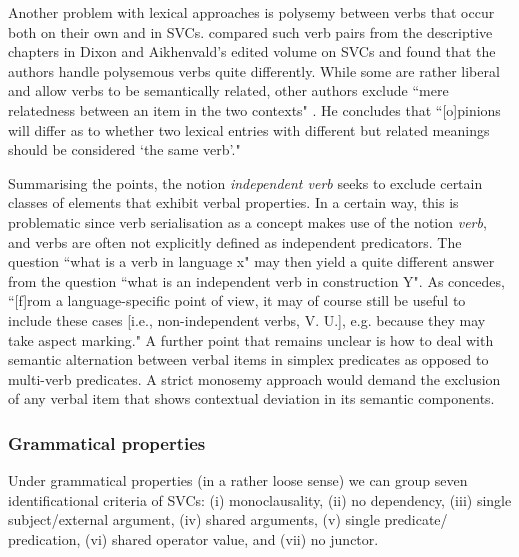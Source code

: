 Another problem with lexical approaches is polysemy between verbs that occur both on their own and in SVCs. \citet{enfield2009review} compared such verb pairs from the descriptive chapters in Dixon and Aikhenvald's edited volume on SVCs and found that the authors handle polysemous verbs quite differently. While some are rather liberal and allow verbs to be semantically related, other authors exclude ``mere relatedness between an item in the two contexts" \citep[448]{enfield2009review}. He concludes that ``[o]pinions will differ as to whether two lexical entries with different but related meanings should be considered `the same verb’."

Summarising the points, the notion \textit{independent verb} seeks to exclude certain classes of elements that exhibit verbal properties. In a certain way, this is problematic since verb serialisation as a concept makes use of the notion \textit{verb}, and verbs are often not explicitly defined as independent predicators. The question ``what is a verb in language x" may then yield a quite different answer from the question ``what is an independent verb in construction Y". As \citet[304]{haspelmath2016serial} concedes, ``[f]rom a language-specific point of view, it may of course still be useful to include these cases [i.e., non-independent verbs, V. U.], e.g. because they may take aspect marking." A further point that remains unclear is how to deal with semantic alternation between verbal items in simplex predicates as opposed to multi-verb predicates. A strict monosemy approach would demand the exclusion of any verbal item that shows contextual deviation in its semantic components.

\subsubsection{Grammatical properties}\label{sec:gramprop}

Under grammatical properties (in a rather loose sense) we can group seven identificational criteria of SVCs: (i) monoclausality, (ii) no dependency, (iii) single subject/external argument, (iv) shared arguments, (v) single predicate/ predication, (vi) shared operator value, and (vii) no junctor.

